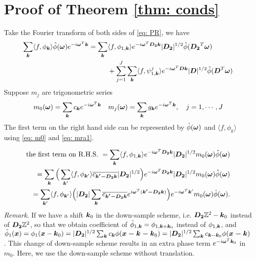 \section{Proof of Theorem \ref{thm: conds}}\label{app: cond-thm}
Take the Fourier transform of both sides of \eqref{eq: PR}, we have 
\begin{align*}
\sum_{\boldsymbol{k}}\langle f,\phi_{\boldsymbol{k}}\rangle\hat{\phi}(\boldsymbol{\omega})e^{-i\boldsymbol{\omega}^T\boldsymbol{k}} = \sum_{\boldsymbol{k}}&\langle f,\phi_{1,\boldsymbol{k}}\rangle e^{-i\boldsymbol{\omega}^T\boldsymbol{D_2k}}|\boldsymbol{D_2}|^{1/2}\hat{\phi}(\boldsymbol{D_2}^T\boldsymbol{\omega}) \\
&+ \sum_{j=1}^J\sum_{\boldsymbol{k}}\langle f,\psi^j_{1,\boldsymbol{k}}\rangle e^{-i\boldsymbol{\omega}^T\boldsymbol{Dk}}|\boldsymbol{D}|^{1/2}\hat{\phi}(\boldsymbol{D}^T\boldsymbol{\omega})
\end{align*}
Suppose $m_j$ are trigonometric series
\begin{align}\label{eq: mra1}
m_0(\boldsymbol{\omega}) = \sum_{\boldsymbol{k}} c_{\boldsymbol{k}}e^{-i \boldsymbol{\omega}^T\boldsymbol{k}} \quad
m_j(\boldsymbol{\omega}) = \sum_{\boldsymbol{k}} g_{\boldsymbol{k}}e^{-i \boldsymbol{\omega}^T\boldsymbol{k}},\quad j=1,\cdots,J
\end{align}
The first term on the right hand side can be represented by $\hat{\phi}(\boldsymbol{\omega})$ and $\langle f,\phi_k\rangle$ using \eqref{eq: m0} and \eqref{eq: mra1}.

\begin{align*}
\text{the first term on R.H.S. } = \sum_{\boldsymbol{k}}\langle f,\phi_{1,\boldsymbol{k}}\rangle e^{-i\boldsymbol{\omega}^T\boldsymbol{D_2k}}|\boldsymbol{D_2}|^{1/2}m_0(\boldsymbol{\omega})\hat{\phi}(\boldsymbol{\omega}) \\= \sum_{\boldsymbol{k}}\Big(\sum_{\boldsymbol{k}'}\langle f,\phi_{\boldsymbol{k}'}\rangle\overline{c_{\boldsymbol{k'-D_2k}}}|\boldsymbol{D_2}|^{1/2}\Big)e^{-i\boldsymbol{\omega}^T\boldsymbol{D_2k}}|\boldsymbol{D_2}|^{1/2}m_0(\boldsymbol{\omega})\hat{\phi}(\boldsymbol{\omega})\\
=\sum_{\boldsymbol{k}'}\langle f,\phi_{\boldsymbol{k}'}\rangle\Big(|\boldsymbol{D_2}|\sum_{\boldsymbol{k}}\overline{c_{\boldsymbol{k'-D_2k}}}e^{i\boldsymbol{\omega}^T(\boldsymbol{k'-D_2k})}\Big)e^{-i\boldsymbol{\omega} ^T\boldsymbol{k}'} m_0(\boldsymbol{\omega})\hat{\phi}(\boldsymbol{\omega}).
\end{align*}
{\it Remark}.
If we have a shift $\boldsymbol{k}_0$ in the down-sample scheme, i.e. $\boldsymbol{D_2}\mathbb{Z}^2 - \boldsymbol{k}_0$ instead of $\boldsymbol{D_2}\mathbb{Z}^2$, so that we obtain coefficient of $\tilde{\phi}_{1,\boldsymbol{k}} = \phi_{1,\boldsymbol{k}+\boldsymbol{k}_0}$ instead of $\phi_{1,\boldsymbol{k}}$, and $\tilde{\phi}_1(\boldsymbol{x}) =\phi_1(\boldsymbol{x}-\boldsymbol{k}_0)= |\boldsymbol{D_2}|^{1/2}\sum_{\boldsymbol{k}}c_{\boldsymbol{k}}\phi(\boldsymbol{x-k-k}_0) = |\boldsymbol{D_2}|^{1/2}\sum_{\boldsymbol{k}}c_{\boldsymbol{k}-\boldsymbol{k}_0}\phi(\boldsymbol{x-k})$. This change of down-sample scheme results in an extra phase term $e^{-i\boldsymbol{\omega}^T \boldsymbol{k}_0}$ in $m_0$. Here, we use the down-sample scheme without translation.

